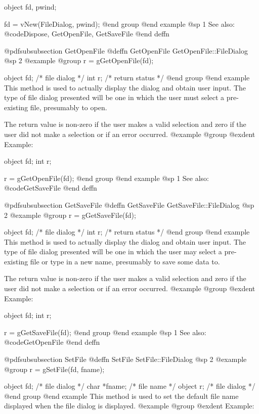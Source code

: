 object  fd, pwind;

fd = vNew(FileDialog, pwind);
@end group
@end example
@sp 1
See also:  @code{Dispose, GetOpenFile, GetSaveFile}
@end deffn





@pdfsubsubsection {GetOpenFile}
@deffn {GetOpenFile} GetOpenFile::FileDialog
@sp 2
@example
@group
r = gGetOpenFile(fd);

object  fd;     /*  file dialog    */
int     r;      /*  return status  */
@end group
@end example
This method is used to actually display the dialog and obtain user input.
The type of file dialog presented will be one in which the user must
select a pre-existing file, presumably to open.

The return value is non-zero if the user makes a valid selection and
zero if the user did not make a selection or if an error occurred.
@example
@group
@exdent Example:

object  fd;
int     r;

r = gGetOpenFile(fd);
@end group
@end example
@sp 1
See also:  @code{GetSaveFile}
@end deffn






@pdfsubsubsection {GetSaveFile}
@deffn {GetSaveFile} GetSaveFile::FileDialog
@sp 2
@example
@group
r = gGetSaveFile(fd);

object  fd;     /*  file dialog    */
int     r;      /*  return status  */
@end group
@end example
This method is used to actually display the dialog and obtain user input.
The type of file dialog presented will be one in which the user may
select a pre-existing file or type in a new name, presumably to save some
data to.

The return value is non-zero if the user makes a valid selection and
zero if the user did not make a selection or if an error occurred.
@example
@group
@exdent Example:

object  fd;
int     r;

r = gGetSaveFile(fd);
@end group
@end example
@sp 1
See also:  @code{GetOpenFile}
@end deffn








@pdfsubsubsection {SetFile}
@deffn {SetFile} SetFile::FileDialog
@sp 2
@example
@group
r = gSetFile(fd, fname);

object  fd;     /*  file dialog  */
char    *fname; /*  file name    */
object  r;      /*  file dialog  */
@end group
@end example
This method is used to set the default file name displayed when the
file dialog is displayed.
@example
@group
@exdent Example:

